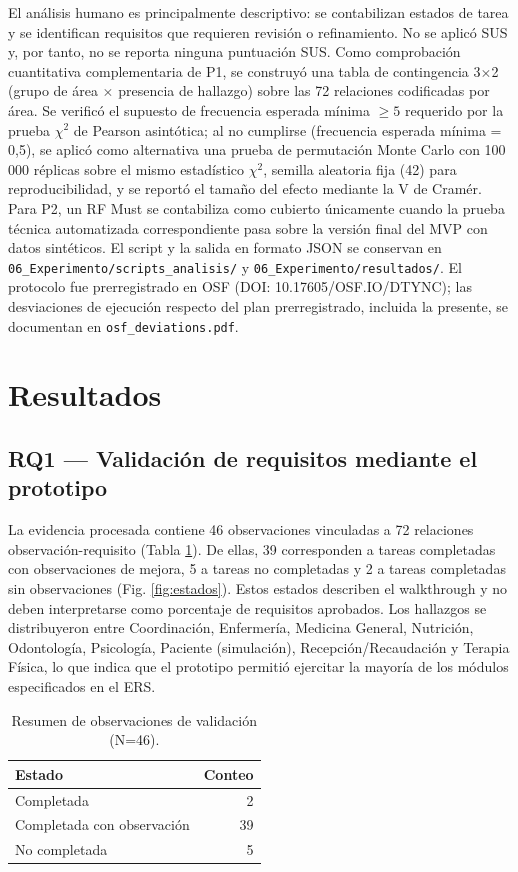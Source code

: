 \documentclass[runningheads]{llncs}
\begin{document}
	El análisis humano es principalmente descriptivo: se contabilizan estados de tarea y se identifican requisitos que requieren revisión o refinamiento. No se aplicó SUS y, por tanto, no se reporta ninguna puntuación SUS. Como comprobación cuantitativa complementaria de P1, se construyó una tabla de contingencia 3$\times$2 (grupo de área $\times$ presencia de hallazgo) sobre las 72 relaciones codificadas por área. Se verificó el supuesto de frecuencia esperada mínima $\geq 5$ requerido por la prueba $\chi^2$ de Pearson asintótica; al no cumplirse (frecuencia esperada mínima = 0,5), se aplicó como alternativa una prueba de permutación Monte Carlo con 100\,000 réplicas sobre el mismo estadístico $\chi^2$, semilla aleatoria fija (42) para reproducibilidad, y se reportó el tamaño del efecto mediante la V de Cramér. Para P2, un RF Must se contabiliza como cubierto únicamente cuando la prueba técnica automatizada correspondiente pasa sobre la versión final del MVP con datos sintéticos. El script y la salida en formato JSON se conservan en \texttt{06\_Experimento/scripts\_analisis/} y \texttt{06\_Experimento/resultados/}. El protocolo fue prerregistrado en OSF (DOI: 10.17605/OSF.IO/DTYNC); las desviaciones de ejecución respecto del plan prerregistrado, incluida la presente, se documentan en \texttt{osf\_deviations.pdf}.
	
	\section{Resultados}
	\subsection{RQ1 --- Validación de requisitos mediante el prototipo}
	La evidencia procesada contiene 46 observaciones vinculadas a 72 relaciones observación-requisito (Tabla \ref{tab:resumen}). De ellas, 39 corresponden a tareas completadas con observaciones de mejora, 5 a tareas no completadas y 2 a tareas completadas sin observaciones (Fig. \ref{fig:estados}). Estos estados describen el walkthrough y no deben interpretarse como porcentaje de requisitos aprobados. Los hallazgos se distribuyeron entre Coordinación, Enfermería, Medicina General, Nutrición, Odontología, Psicología, Paciente (simulación), Recepción/Recaudación y Terapia Física, lo que indica que el prototipo permitió ejercitar la mayoría de los módulos especificados en el ERS.
	
	\begin{table}[H]
		\centering
		\caption{Resumen de observaciones de validación (N=46).}
		\label{tab:resumen}
		\begin{tabular}{lr}
			\toprule
			Estado & Conteo\\
			\midrule
			Completada & 2\\
			Completada con observación & 39\\
			No completada & 5\\
			\bottomrule
		\end{tabular}
	\end{table}
	
\end{document}
